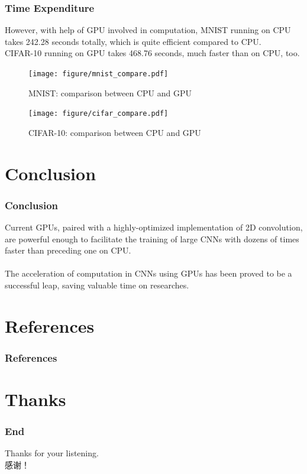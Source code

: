 \documentclass[10pt, mathserif]{beamer}	%
\newcommand{\ftitle}[1]{\frametitle{\hspace{4ex} {#1}}}	%
\begin{document}
\begin{CJK}{UTF8}{song}
\begin{frame}
	\ftitle{Time Expenditure}
	However, with help of GPU involved in computation, MNIST running on CPU takes 242.28 seconds totally, which is quite efficient compared to CPU. \\
	CIFAR-10 running on GPU takes 468.76 seconds, much faster than on CPU, too.\\
	\begin{minipage}{0.45\textwidth}
		\begin{figure}
			\centering
			\texttt{[image: figure/mnist\_compare.pdf]}
			\caption{MNIST: comparison between CPU and GPU}
		\end{figure}
	\end{minipage}
	\hfill
	\begin{minipage}{0.45\textwidth}
		\begin{figure}
			\centering
			\texttt{[image: figure/cifar\_compare.pdf]}
			\caption{CIFAR-10: comparison between CPU and GPU}
		\end{figure}		
	\end{minipage}
\end{frame}

\section{Conclusion}
\begin{frame}
	\ftitle{Conclusion}
	Current GPUs, paired with a highly-optimized implementation of 2D convolution, are powerful enough to facilitate the training of large CNNs with {\color{red}dozens of times faster} than preceding one on CPU. \\
	~\\
	The acceleration of computation in CNNs using GPUs has been proved to be a successful leap, saving valuable time on researches. 
\end{frame}

\section{References}
\begin{frame}[allowframebreaks]
	\ftitle{References}
	
	
\end{frame}

\section*{Thanks}
\begin{frame}
	\ftitle{End}
	\Huge Thanks for your listening. \\
	感谢！
\end{frame}

\end{CJK}
\end{document}
